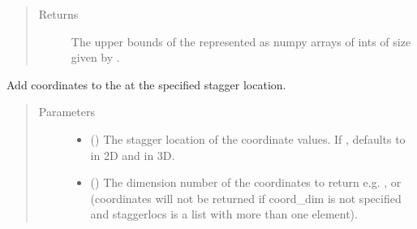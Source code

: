 \documentclass[letterpaper,10pt,english]{sphinxmanual}
\begin{document}
\begin{fulllineitems}
\begin{fulllineitems}
\begin{quote}
\begin{description}
\item[{Returns}] \leavevmode
The upper bounds of the {\hyperref[\detokenize{grid:ESMF.api.grid.Grid}]{}}
represented as numpy arrays of ints of size given by
.

\end{description}\end{quote}

\end{fulllineitems}


\begin{fulllineitems}
\label{\detokenize{grid:ESMF.api.grid.Grid.add_coords}}
Add coordinates to the {\hyperref[\detokenize{grid:ESMF.api.grid.Grid}]{}} at the specified
stagger location.
\begin{quote}\begin{description}
\item[{Parameters}] \leavevmode\begin{itemize}
\item {} 
 ({\hyperref[\detokenize{StaggerLoc:ESMF.api.constants.StaggerLoc}]{}}) \textendash{} The stagger location of the coordinate
values. If , defaults to
{\hyperref[\detokenize{StaggerLoc:ESMF.api.constants.StaggerLoc.CENTER}]{}}
in 2D and {\hyperref[\detokenize{StaggerLoc:ESMF.api.constants.StaggerLoc.CENTER_VCENTER}]{}} in
3D.

\item {} 
 () \textendash{} The dimension number of the coordinates to return
e.g. , or 
(coordinates will not be returned if coord\_dim is not specified and
staggerlocs is a list with more than one element).


\end{itemize}
\end{description}
\end{quote}
\end{fulllineitems}
\end{fulllineitems}
\end{document}
